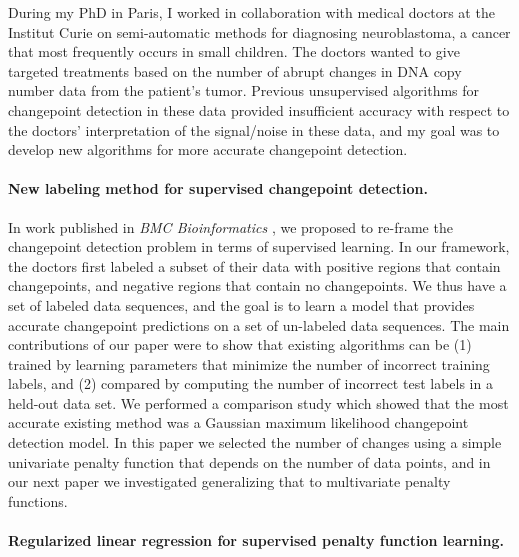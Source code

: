 \documentclass{article}
\begin{document}
During my PhD in Paris, I worked in collaboration with medical doctors
at the Institut Curie on semi-automatic methods for diagnosing
neuroblastoma, a cancer that most frequently occurs in small
children. The doctors wanted to give targeted treatments based on the
number of abrupt changes in DNA copy number data
from the patient's tumor. Previous unsupervised algorithms for
changepoint detection in these data provided insufficient accuracy
with respect to the doctors' interpretation of the signal/noise in
these data, and my goal was to develop new algorithms for more
accurate changepoint detection.

\paragraph{New labeling method for supervised changepoint detection.}

In work published in \emph{BMC Bioinformatics}
\citep{HOCKING-breakpoints}, we proposed to re-frame the changepoint
detection problem in terms of supervised learning. In our framework,
the doctors first labeled a subset of their data with positive regions
that contain changepoints, and negative regions that contain no
changepoints. We thus have a set of labeled data sequences, and the
goal is to learn a model that provides accurate changepoint predictions
on a set of un-labeled data sequences. The main contributions of our
paper were to show that existing algorithms can be (1) trained by
learning parameters that minimize the number of
incorrect training labels, and (2) compared by computing the number of
incorrect test labels in a held-out data set. We performed a
comparison study which showed that the most accurate existing method
was a Gaussian maximum likelihood changepoint detection model. 
In this paper we selected the number of changes using a
simple univariate penalty function that depends on the number of data
points, and in our next paper we investigated generalizing that to
multivariate penalty functions.

\paragraph{Regularized linear regression for supervised penalty
  function learning.} 
\end{document}
